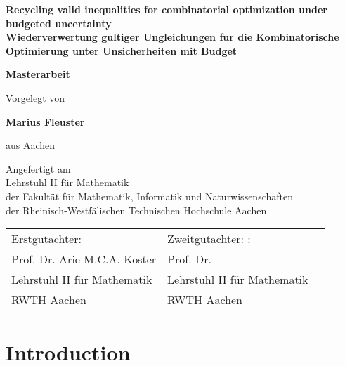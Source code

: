 \documentclass[titlepage, a4paper]{amsbook}
\theoremstyle{plain}
\theoremstyle{break}
\theoremstyle{definition}
\theoremstyle{remark}
\numberwithin{equation}{thm}
\begin{document}
\newcommand{\fix}[1]{\text{Fix}_{#1}}
\newcommand{\s}[1]{\mathcal{SP}_{#1}}
\newcommand{\set}[1]{\lbrace 1, \ldots , #1 \rbrace}
\newcommand{\U}{\Sigma}
\newcommand{\Hd}{\Delta}

\begin{titlepage}
\begin{center}

\textbf{\LARGE Recycling valid inequalities for combinatorial optimization under budgeted uncertainty} \\
\textbf{\LARGE Wiederverwertung gultiger Ungleichungen fur die Kombinatorische Optimierung unter Unsicherheiten mit Budget}

\bigskip\bigskip
\textbf{Masterarbeit}


\bigskip\bigskip\bigskip
Vorgelegt von

\bigskip
\textbf{Marius Fleuster}

\bigskip
aus Aachen


\vfill
Angefertigt am\\
Lehrstuhl II f{\"u}r Mathematik\\ 
der Fakult\"at f{\"u}r Mathematik, Informatik und Naturwissenschaften\\ 
der Rheinisch-Westf\"alischen Technischen Hochschule Aachen

\bigskip

\bigskip
 \begin{tabular}[t]{ll@{}l}
    
Erstgutachter:& Zweitgutachter: : \\
Prof. Dr. Arie M.C.A. Koster  & Prof. Dr.   \\
Lehrstuhl II f\"ur Mathematik  & Lehrstuhl II f\"ur Mathematik  \\
RWTH Aachen  & RWTH Aachen  \\
\end{tabular}


\end{center}
\end{titlepage}


\tableofcontents




\chapter{Introduction}
\end{document}
